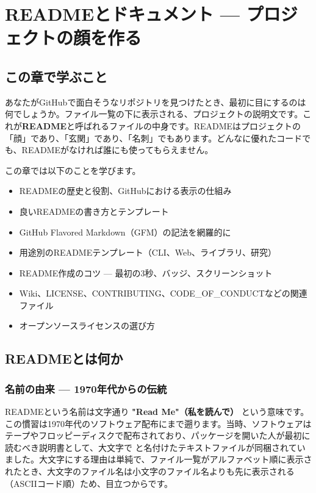 \chapter{READMEとドキュメント --- プロジェクトの顔を作る}

\section{この章で学ぶこと}

あなたがGitHubで面白そうなリポジトリを見つけたとき、最初に目にするのは何でしょうか。ファイル一覧の下に表示される、プロジェクトの説明文です。これが\textbf{README}と呼ばれるファイルの中身です。READMEはプロジェクトの「顔」であり、「玄関」であり、「名刺」でもあります。どんなに優れたコードでも、READMEがなければ誰にも使ってもらえません。

この章では以下のことを学びます。

\begin{itemize}
  \item READMEの歴史と役割、GitHubにおける表示の仕組み
  \item 良いREADMEの書き方とテンプレート
  \item GitHub Flavored Markdown（GFM）の記法を網羅的に
  \item 用途別のREADMEテンプレート（CLI、Web、ライブラリ、研究）
  \item README作成のコツ --- 最初の3秒、バッジ、スクリーンショット
  \item Wiki、LICENSE、CONTRIBUTING、CODE\_OF\_CONDUCTなどの関連ファイル
  \item オープンソースライセンスの選び方
\end{itemize}

\section{READMEとは何か}

\subsection{名前の由来 --- 1970年代からの伝統}

READMEという名前は文字通り \textbf{"Read Me"（私を読んで）} という意味です。この慣習は1970年代のソフトウェア配布にまで遡ります。当時、ソフトウェアはテープやフロッピーディスクで配布されており、パッケージを開いた人が最初に読むべき説明書として、大文字で  と名付けたテキストファイルが同梱されていました。大文字にする理由は単純で、ファイル一覧がアルファベット順に表示されたとき、大文字のファイル名は小文字のファイル名よりも先に表示される（ASCIIコード順）ため、目立つからです。

